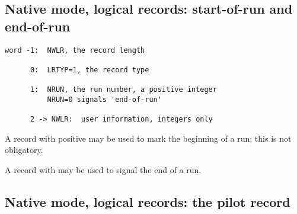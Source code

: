 \subsection{Native mode, logical records: start-of-run and end-of-run}

\begin{verbatim}
word -1:  NWLR, the record length

      0:  LRTYP=1, the record type

      1:  NRUN, the run number, a positive integer
          NRUN=0 signals 'end-of-run'

      2 -> NWLR:  user information, integers only
\end{verbatim}

A record  with  positive may be used to mark the beginning
of a run; this is not obligatory.

A record  with  may be used to signal the end of a run.

\subsection*{Native mode, logical records: the pilot record}

